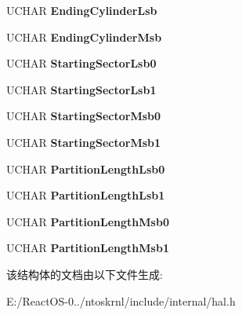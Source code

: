 \begin{DoxyCompactItemize}
U\+C\+H\+AR {\bfseries Ending\+Cylinder\+Lsb}
\item 
\mbox{\label{struct___p_a_r_t_i_t_i_o_n___d_e_s_c_r_i_p_t_o_r_a2519cc8dd04d0e026501738936359107}} 
U\+C\+H\+AR {\bfseries Ending\+Cylinder\+Msb}
\item 
\mbox{\label{struct___p_a_r_t_i_t_i_o_n___d_e_s_c_r_i_p_t_o_r_ae98ac6dfbdd270a239cc2c7a4ea004ab}} 
U\+C\+H\+AR {\bfseries Starting\+Sector\+Lsb0}
\item 
\mbox{\label{struct___p_a_r_t_i_t_i_o_n___d_e_s_c_r_i_p_t_o_r_ad90ca6f8370b8c6eb912858001139cba}} 
U\+C\+H\+AR {\bfseries Starting\+Sector\+Lsb1}
\item 
\mbox{\label{struct___p_a_r_t_i_t_i_o_n___d_e_s_c_r_i_p_t_o_r_a2f28abb0dff36eed9b36589b39e5a1b6}} 
U\+C\+H\+AR {\bfseries Starting\+Sector\+Msb0}
\item 
\mbox{\label{struct___p_a_r_t_i_t_i_o_n___d_e_s_c_r_i_p_t_o_r_a250de897856ee3034c63e5ac1f86497c}} 
U\+C\+H\+AR {\bfseries Starting\+Sector\+Msb1}
\item 
\mbox{\label{struct___p_a_r_t_i_t_i_o_n___d_e_s_c_r_i_p_t_o_r_a661dac3bf201f4f52682328d59a30e4b}} 
U\+C\+H\+AR {\bfseries Partition\+Length\+Lsb0}
\item 
\mbox{\label{struct___p_a_r_t_i_t_i_o_n___d_e_s_c_r_i_p_t_o_r_a412a1f75129edaec7fd1db06536c0b46}} 
U\+C\+H\+AR {\bfseries Partition\+Length\+Lsb1}
\item 
\mbox{\label{struct___p_a_r_t_i_t_i_o_n___d_e_s_c_r_i_p_t_o_r_a3fbd03936b398cbbb591b476de51cee9}} 
U\+C\+H\+AR {\bfseries Partition\+Length\+Msb0}
\item 
\mbox{\label{struct___p_a_r_t_i_t_i_o_n___d_e_s_c_r_i_p_t_o_r_a432aeb58c75c05bce0459e047ce5e8e7}} 
U\+C\+H\+AR {\bfseries Partition\+Length\+Msb1}
\end{DoxyCompactItemize}


该结构体的文档由以下文件生成\+:\begin{DoxyCompactItemize}
\item 
E\+:/\+React\+O\+S-\/0../ntoskrnl/include/internal/hal.\+h\end{DoxyCompactItemize}
